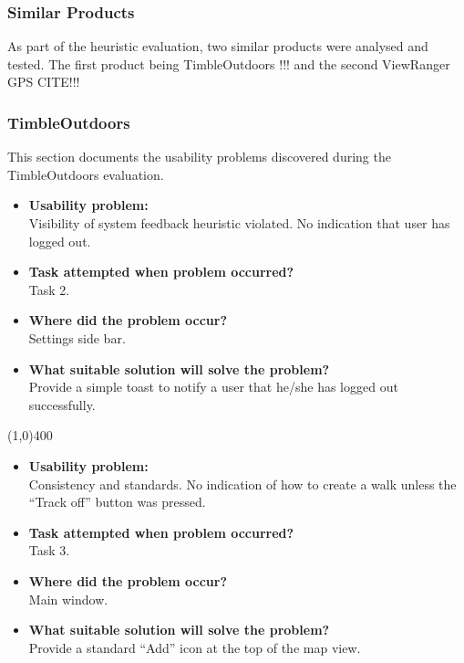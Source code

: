 \documentclass[11pt,a4paper]{article}
\begin{document}
\subsubsection{Similar Products}
As part of the heuristic evaluation, two similar products were analysed and tested. The first product being TimbleOutdoors !!! and the second ViewRanger GPS CITE!!!

\subsubsection{TimbleOutdoors}

This section documents the usability problems discovered during the TimbleOutdoors evaluation.

\begin{itemize}
	\item\textbf{Usability problem: }\\
	 Visibility of system feedback heuristic violated. No indication that user has logged out.

	\item\textbf{Task attempted when problem occurred?}\\
	Task 2.

	\item\textbf{Where did the problem occur?}\\
	Settings side bar.

	\item\textbf{What suitable solution will solve the problem?}\\
	Provide a simple toast to notify a user that he/she has logged out successfully.
\end{itemize}

\line(1,0){400}

\begin{itemize}
	\item\textbf{Usability problem:}\\
	Consistency and standards. No indication of how to create a walk unless the ``Track off'' button was pressed.

	\item\textbf{Task attempted when problem occurred?}\\
	Task 3.

	\item\textbf{Where did the problem occur?}\\
	Main window.

	\item\textbf{What suitable solution will solve the problem?}\\
	Provide a standard ``Add'' icon at the top of the map view.
\end{itemize}
\end{document}
